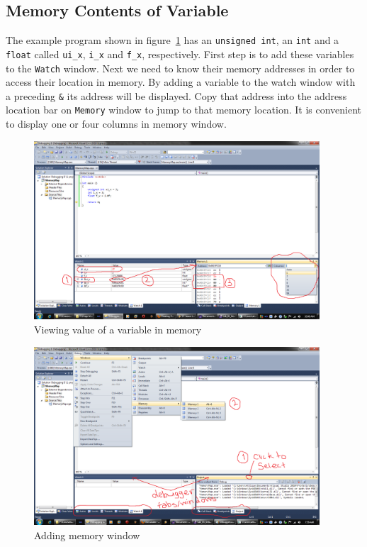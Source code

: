\documentclass[12pt,a4paper]{article}
\begin{document}
\subsection{Memory Contents of Variable}
The example program shown in figure~\ref{Debugger-Layout} has an \verb|unsigned int|, an \verb|int| and a \verb|float| called \verb|ui_x|, \verb|i_x| and \verb|f_x|, respectively. First step is to add these variables to the \verb|Watch| window. Next we need to know their memory addresses in order to access their location in memory. By adding a variable to the watch window with a preceding \verb|&| its address will be displayed. Copy that address into the address location bar on \verb|Memory| window to jump to that memory location. It is convenient to display one or four columns in memory window.

\begin{figure}[H]
\centering
\label{Debugger-Layout}
\includegraphics[width=0.95\textwidth]{DebuggerLayout.png}
\caption{Viewing value of a variable in memory}
\end{figure}

\begin{figure}[H]
\centering
\label{Adding-Memory-Window}
\includegraphics[width=0.95\textwidth]{AddingMemoryWindow.png}
\caption{Adding memory window}
\end{figure}
\end{document}
